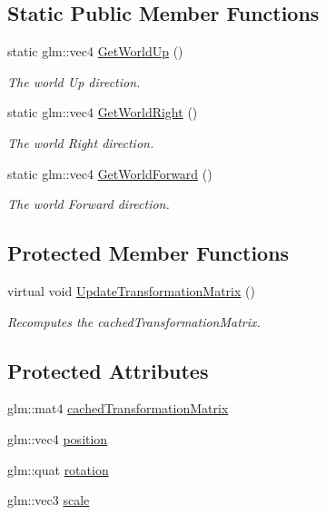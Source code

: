\subsection*{Static Public Member Functions}
\begin{DoxyCompactItemize}
\item 
static glm\+::vec4 \hyperlink{class_scene_object_a334a5fb4e91d85fe6a046bd83dd235d3}{Get\+World\+Up} ()
\begin{DoxyCompactList}\small\item\em The world \textquotesingle{}Up\textquotesingle{} direction. \end{DoxyCompactList}\item 
static glm\+::vec4 \hyperlink{class_scene_object_a46d0ffed082f7bd515b9550ef9f9a86a}{Get\+World\+Right} ()
\begin{DoxyCompactList}\small\item\em The world \textquotesingle{}Right\textquotesingle{} direction. \end{DoxyCompactList}\item 
static glm\+::vec4 \hyperlink{class_scene_object_a6fa71efda895933be4ee684745980e68}{Get\+World\+Forward} ()
\begin{DoxyCompactList}\small\item\em The world \textquotesingle{}Forward\textquotesingle{} direction. \end{DoxyCompactList}\end{DoxyCompactItemize}
\subsection*{Protected Member Functions}
\begin{DoxyCompactItemize}
\item 
virtual void \hyperlink{class_scene_object_a20e31da3f9d2765de50cdb2d637ae6c9}{Update\+Transformation\+Matrix} ()
\begin{DoxyCompactList}\small\item\em Recomputes the cached\+Transformation\+Matrix. \end{DoxyCompactList}\end{DoxyCompactItemize}
\subsection*{Protected Attributes}
\begin{DoxyCompactItemize}
\item 
glm\+::mat4 \hyperlink{class_scene_object_aac3f13eea8a7b455e8cffc6eceef211c}{cached\+Transformation\+Matrix}
\item 
glm\+::vec4 \hyperlink{class_scene_object_ab4aa9bed778001970c38ea11ef34b285}{position}
\item 
glm\+::quat \hyperlink{class_scene_object_ae27376aaca87543a75b5a2cd0daf6e2f}{rotation}
\item 
glm\+::vec3 \hyperlink{class_scene_object_a62c686b880fe4f58dec64a409e56de26}{scale}
\end{DoxyCompactItemize}
